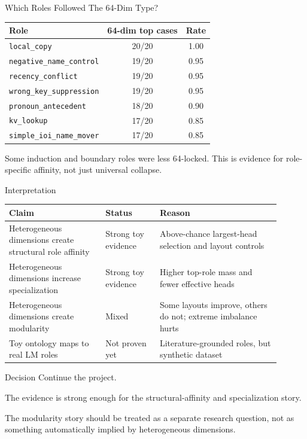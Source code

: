 \documentclass[aspectratio=169]{beamer}
\begin{document}
\begin{frame}{Which Roles Followed The 64-Dim Type?}
  \scriptsize
  \begin{tabular}{lcc}
    \toprule
    Role & 64-dim top cases & Rate \\
    \midrule
    \texttt{local\_copy} & 20/20 & 1.00 \\
    \texttt{negative\_name\_control} & 19/20 & 0.95 \\
    \texttt{recency\_conflict} & 19/20 & 0.95 \\
    \texttt{wrong\_key\_suppression} & 19/20 & 0.95 \\
    \texttt{pronoun\_antecedent} & 18/20 & 0.90 \\
    \texttt{kv\_lookup} & 17/20 & 0.85 \\
    \texttt{simple\_ioi\_name\_mover} & 17/20 & 0.85 \\
    \bottomrule
  \end{tabular}

  \vspace{0.35cm}
  Some induction and boundary roles were less 64-locked. This is evidence for role-specific affinity, not just universal collapse.
\end{frame}

\begin{frame}{Interpretation}
  \small
  \begin{tabular}{p{0.32\linewidth}p{0.18\linewidth}p{0.40\linewidth}}
    \toprule
    Claim & Status & Reason \\
    \midrule
    Heterogeneous dimensions create structural role affinity & Strong toy evidence & Above-chance largest-head selection and layout controls \\
    Heterogeneous dimensions increase specialization & Strong toy evidence & Higher top-role mass and fewer effective heads \\
    Heterogeneous dimensions create modularity & Mixed & Some layouts improve, others do not; extreme imbalance hurts \\
    Toy ontology maps to real LM roles & Not proven yet & Literature-grounded roles, but synthetic dataset \\
    \bottomrule
  \end{tabular}
\end{frame}

\begin{frame}{Decision}
  \large
  Continue the project.

  \vspace{0.5cm}
  \normalsize
  The evidence is strong enough for the structural-affinity and specialization story.

  \vspace{0.25cm}
  The modularity story should be treated as a separate research question, not as something automatically implied by heterogeneous dimensions.
\end{frame}
\end{document}
